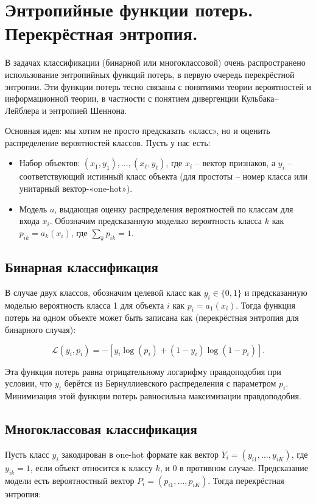 \section*{Энтропийные функции потерь. Перекрёстная энтропия.}

В задачах классификации (бинарной или многоклассовой) очень распространено использование энтропийных функций потерь, в первую очередь перекрёстной энтропии. Эти функции потерь тесно связаны с понятиями теории вероятностей и информационной теории, в частности с понятием дивергенции Кульбака–Лейблера и энтропией Шеннона.

Основная идея: мы хотим не просто предсказать «класс», но и оценить распределение вероятностей классов. Пусть у нас есть:

\begin{itemize}
    \item Набор объектов: $(x_1, y_1), \dots, (x_\ell, y_\ell)$, где $x_i$ – вектор признаков, а $y_i$ – соответствующий истинный класс объекта (для простоты – номер класса или унитарный вектор-«one-hot»).
    \item Модель $a$, выдающая оценку распределения вероятностей по классам для входа $x_i$. Обозначим предсказанную моделью вероятность класса $k$ как $p_{ik} = a_k(x_i)$, где $\sum_k p_{ik} = 1$.
\end{itemize}

\subsection*{Бинарная классификация}

В случае двух классов, обозначим целевой класс как $y_i \in \{0,1\}$ и предсказанную моделью вероятность класса 1 для объекта $i$ как $p_i = a_1(x_i)$. Тогда функция потерь на одном объекте может быть записана как (перекрёстная энтропия для бинарного случая):

$$
\mathcal{L}(y_i, p_i) = -\left[y_i\log(p_i) + (1 - y_i)\log(1 - p_i)\right].
$$

Эта функция потерь равна отрицательному логарифму правдоподобия при условии, что $y_i$ берётся из Бернуллиевского распределения с параметром $p_i$. Минимизация этой функции потерь равносильна максимизации правдоподобия.

\subsection*{Многоклассовая классификация}

Пусть класс $y_i$ закодирован в one-hot формате как вектор $Y_i = (y_{i1}, \dots, y_{iK})$, где $y_{ik} = 1$, если объект относится к классу $k$, и 0 в противном случае. Предсказание модели есть вероятностный вектор $P_i = (p_{i1}, \dots, p_{iK})$. Тогда перекрёстная энтропия:

